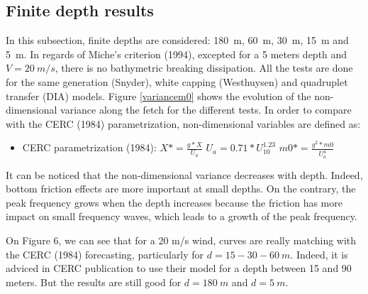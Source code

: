 \subsection{Finite depth \tomawac results}
In this subsection, finite depths are considered: 180~m, 60~m, 30~m, 15~m and
5~m. In regards of Miche's criterion (1994), excepted for a 5 meters depth and
$V = 20~m/s$, there is no bathymetric breaking dissipation. All the tests are
done for the same generation (Snyder), white capping (Westhuysen) and
quadruplet transfer (DIA) models. Figure \ref{variancem0} shows the evolution
of the non-dimensional variance along the fetch for the different tests. In
order to compare with the CERC (1984) parametrization, non-dimensional
variables are defined as:
\begin{itemize}
\item CERC parametrization (1984):
\subitem $X* = \frac{g*X}{U_a}$
\subitem $U_a = 0.71*U_{10}^{1.23}$
\subitem $m0* = \frac{g^2*m0}{U_a^4}$
\end{itemize}
It can be noticed that the non-dimensional variance decreases with depth.
Indeed, bottom friction effects are more important at small depths. On the
contrary, the peak frequency grows when the depth increases because the
friction has more impact on small frequency waves, which leads to a growth of
the peak frequency.

On Figure 6, we can see that for a 20 m/s wind, \tomawac curves are really
matching with the CERC (1984) forecasting, particularly for $d = 15 - 30 -
60~m$. Indeed, it is adviced in CERC publication to use their model for a depth
between 15 and 90 meters. But the results are still good for $d = 180~m$ and
$d = 5~m$.

